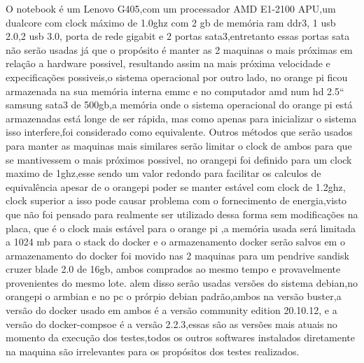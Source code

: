 \documentclass[
	12pt,				%
	openright,			%
	oneside,			%
	a4paper,			%
	english,			%
	french,				%
	spanish,			%
	brazil,				%
	]{abntex2}
\begin{document}
O notebook é um Lenovo G405,com um processador AMD E1-2100 APU,um dualcore com clock máximo de 1.0ghz com 2 gb de memória ram ddr3, 1 usb 2.0,2 usb 3.0, 
porta de rede gigabit e 2 portas sata3,entretanto essas portas sata não serão usadas já que o propósito é manter as 2 maquinas o mais próximas em relação a hardware possivel,
resultando assim na mais próxima velocidade e expecificações possiveis,o sistema operacional por outro lado,
no orange pi ficou armazenada na sua memória interna emmc e no computador amd num hd 2.5`` samsung sata3 de 500gb,a memória onde o sistema operacional do orange pi está armazenadas está longe de ser rápida,
mas como apenas para inicializar o sistema isso interfere,foi considerado como equivalente.\newline
Outros métodos que serão usados para manter as maquinas mais similares serão limitar o clock de ambos para que se mantivessem o mais próximos possivel,
no orangepi foi definido para um clock maximo de 1ghz,esse sendo um valor redondo para facilitar os calculos de equivalência apesar de o orangepi poder se manter estável com clock de 1.2ghz,
clock superior a isso pode causar problema com o fornecimento de energia,visto que não foi pensado para realmente ser utilizado dessa forma sem modificações na placa,
que é o clock mais estável para o orange pi ,a memória usada será limitada a 1024 mb para o stack do docker e o armazenamento docker serão salvos em o armazenamento do docker foi movido nas 2 maquinas para um pendrive sandisk cruzer blade 2.0 de 16gb,
ambos comprados ao mesmo tempo e provavelmente provenientes do mesmo lote.\newline
alem disso serão usadas versões do sistema debian,no orangepi o armbian e no pc o prórpio debian padrão,ambos na versão buster,a versão do docker usado em ambos é a versão community edition 20.10.12,
e a versão do docker-compsoe é a versão 2.2.3,essas são as versões mais atuais no momento da execução dos testes,todos os outros softwares instalados diretamente na maquina são irrelevantes para os propósitos dos testes realizados.
\end{document}
